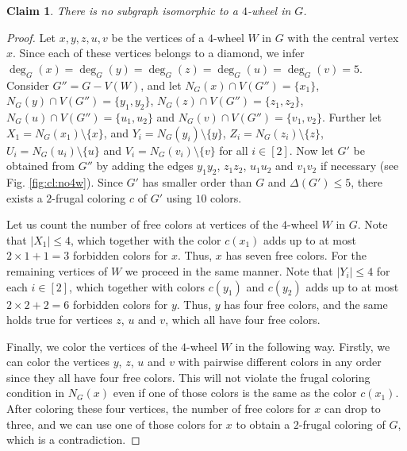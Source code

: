 \documentclass[10pt,a4paper]{article}
\newtheorem{claim}{Claim}
\begin{document}
\begin{claim} There is no subgraph isomorphic to a $4$-wheel in $G$.
\label{cl:no4w}
\end{claim}
\begin{proof}
Let $x,y,z,u,v$ be the vertices of a $4$-wheel $W$ in $G$ with the central vertex $x$. Since each of these vertices belongs to a diamond, we infer $\deg_G(x)=\deg_G(y)=\deg_G(z)=\deg_G(u)=\deg_G(v)=5$.  Consider $G''=G-V(W)$, and let $N_G(x) \cap V(G'')=\{x_1\}$, $N_G(y) \cap V(G'')=\{y_1,y_2\}$, $N_G(z) \cap V(G'')=\{z_1,z_2\}$, $N_G(u) \cap V(G'')=\{u_1,u_2\}$ and $N_G(v) \cap V(G'')=\{v_1,v_2\}$. Further let $X_1=N_G(x_1)\setminus\{x\}$, and $Y_i=N_G(y_i)\setminus\{y\}$, $Z_i=N_G(z_i)\setminus\{z\}$, $U_i=N_G(u_i)\setminus\{u\}$ and $V_i=N_G(v_i)\setminus\{v\}$ for all $i \in [2]$. Now let $G'$ be obtained from $G''$ by adding the edges $y_1y_2$, $z_1z_2$, $u_1u_2$ and $v_1v_2$ if necessary (see Fig. \ref{fig:cl:no4w}). Since $G'$ has smaller order than $G$ and $\Delta(G') \le 5$, there exists a $2$-frugal coloring $c$ of $G'$ using $10$ colors.

Let us count the number of free colors at vertices of the $4$-wheel $W$ in $G$. Note that $|X_1| \le 4$, which together with the color $c(x_1)$ adds up to at most $2 \times 1 + 1=3$ forbidden colors for $x$. Thus, $x$ has seven free colors. For the remaining vertices of $W$ we proceed in the same manner. Note that $|Y_i| \le 4$ for each $i\in [2]$, which together with colors $c(y_1)$ and $c(y_2)$ adds up to at most $2 \times 2 + 2=6$ forbidden colors for $y$. Thus, $y$ has four free colors, and the same holds true for vertices $z$, $u$ and $v$, which all have four free colors.

Finally, we color the vertices of the $4$-wheel $W$ in the following way. Firstly, we can color the vertices $y$, $z$, $u$ and $v$ with pairwise different colors in any order since they all have four free colors. This will not violate the frugal coloring condition in $N_G(x)$ even if one of those colors is the same as the color $c(x_1)$. After coloring these four vertices,  the number of free colors for $x$ can drop to three, and we can use one of those colors for $x$ to obtain a $2$-frugal coloring of $G$, which is a contradiction.
\end{proof}
\end{document}
